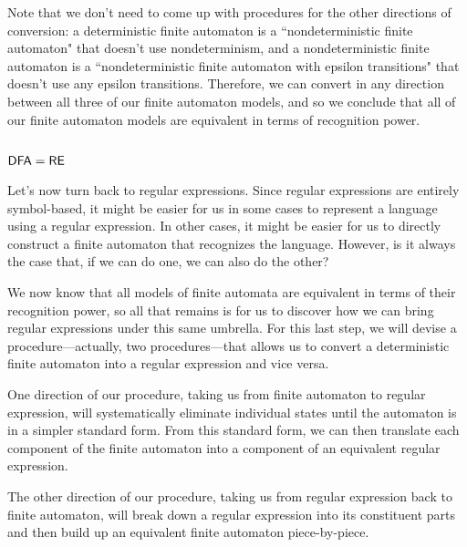Note that we don't need to come up with procedures for the other directions of conversion: a deterministic finite automaton is a ``nondeterministic finite automaton" that doesn't use nondeterminism, and a nondeterministic finite automaton is a ``nondeterministic finite automaton with epsilon transitions" that doesn't use any epsilon transitions. Therefore, we can convert in any direction between all three of our finite automaton models, and so we conclude that all of our finite automaton models are equivalent in terms of recognition power.

\subsection{$\textsf{DFA} = \textsf{RE}$}

Let's now turn back to regular expressions. Since regular expressions are entirely symbol-based, it might be easier for us in some cases to represent a language using a regular expression. In other cases, it might be easier for us to directly construct a finite automaton that recognizes the language. However, is it always the case that, if we can do one, we can also do the other?

We now know that all models of finite automata are equivalent in terms of their recognition power, so all that remains is for us to discover how we can bring regular expressions under this same umbrella. For this last step, we will devise a procedure---actually, two procedures---that allows us to convert a deterministic finite automaton into a regular expression and vice versa.

One direction of our procedure, taking us from finite automaton to regular expression, will systematically eliminate individual states until the automaton is in a simpler standard form. From this standard form, we can then translate each component of the finite automaton into a component of an equivalent regular expression.

The other direction of our procedure, taking us from regular expression back to finite automaton, will break down a regular expression into its constituent parts and then build up an equivalent finite automaton piece-by-piece.

